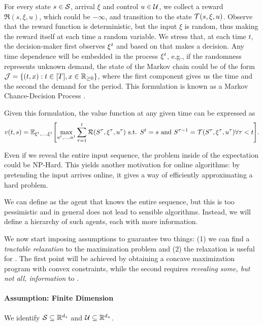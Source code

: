 \documentclass[letterpaper,11pt]{article}
\begin{document}
For every state $s\in\mathcal{S}$, arrival $\xi$ and control $u\in\mathcal{U}$, we  collect a reward $\Re(s,\xi,u)$, which could be $-\infty$, and transition to the state $\mathcal{T}(s,\xi,u)$.
Observe that the reward function is deterministic, but the input $\xi$ is random, thus making the reward itself at each time a random variable.
We stress that, at each time $t$, the decision-maker first observes $\xi^t$ and based on that makes a decision.
Any time dependence will be embedded in the process $\xi^t$, e.g., if the randomness represents unknown demand, the state of the Markov chain could be of the form $\mathcal{J}=\{(t,x):t\in[T],x\in\mathbb{R}_{\geq 0}\}$, where the first component gives us the time and the second the demand for the period.
This formulation is known as a Markov Chance-Decision Process \cite[chap 13]{online_book}.


Given this formulation, the value function at any given time can be expressed as
\begin{equation}
v(t,s) = \E_{\xit,\ldots,\xi^1}\brk*{\max_{u^t,\ldots,u^1}\sum_{\tau=1}^t\Re(S^\tau,\xi^\tau,u^\tau) \text{ s.t. }  S^t=s \text{ and } S^{\tau-1}=\Tr(S^\tau,\xi^\tau,u^\tau) \forall \tau<t }.
\end{equation}

Even if we reveal the entire input sequence, the problem inside of the expectation could be NP-Hard.
This yields another motivation for online algorithms: by pretending the input arrives online, it gives a way of efficiently approximating a hard problem.

We can define \off as the agent that knows the entire sequence, but this is too pessimistic and in general does not lead to sensible algorithms.
Instead, we will define a hierarchy of such agents, each with more information.

We now start imposing assumptions to guarantee two things: (1) we can find a \emph{tractable relaxation} to the maximization problem and (2) the relaxation is useful for \onl.
The first point will be achieved by obtaining a concave maximization program with convex constraints, while the second requires \emph{revealing some, but not all, information} to \off.

\paragraph{Assumption: Finite Dimension}
We identify $\mathcal{S}\subseteq \mathbb{R}^{d_s}$ and $\mathcal{U}\subseteq\mathbb{R}^{d_u}$.
\end{document}
